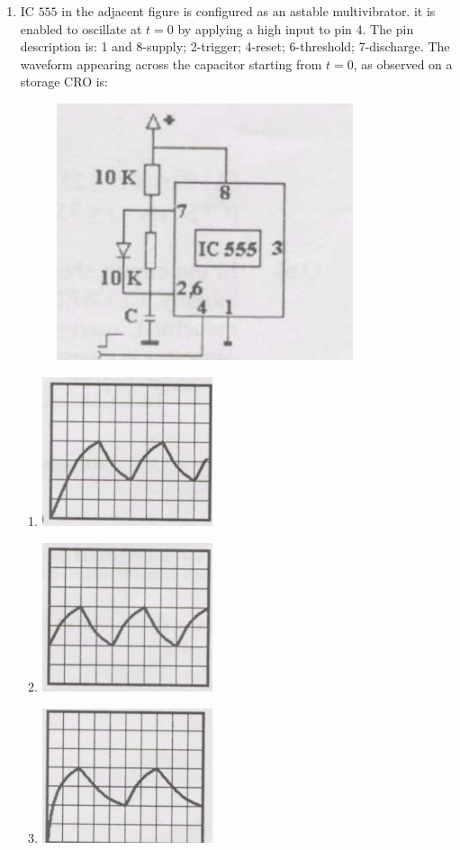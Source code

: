 \documentclass[journal,12pt,onecolumn]{IEEEtran}
\theoremstyle{remark}
\begin{document}
\begin{enumerate}
\item IC $555$ in the adjacent figure is configured as an astable
multivibrator. it is enabled to oscillate at $t=0$ by applying a high input to pin 4. The pin description is: 1 and 8-supply; 2-trigger; 4-reset; 6-threshold; 7-discharge. The waveform appearing across the capacitor starting from $t=0$, as observed on a storage CRO is:
\begin{figure}[h]
	\centering
	\includegraphics[scale=0.5]{figs/fig 7.png}
	\label{Fig-7}
\end{figure}
\begin{enumerate}
\item \includegraphics[width=5cm]{figs/fig 7.1.png}
\item \includegraphics[width=5cm]{figs/fig 7.2.png}
\item \includegraphics[width=5cm]{figs/fig 7.3.png}

\end{enumerate}
\end{enumerate}
\end{document}
